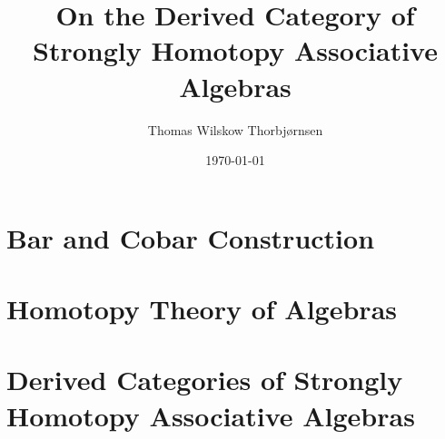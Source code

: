 \documentclass[american,titlepage]{ntnuthesis}
\title{On the Derived Category of Strongly Homotopy Associative Algebras}
\author{Thomas Wilskow Thorbjørnsen}
\date{\today}
\begin{document}
    


    \tableofcontents %

    \printglossary[type=\acronymtype] %
    \printglossary                    %


    \chapter{Bar and Cobar Construction}
        

    \chapter{Homotopy Theory of Algebras}
        

    \chapter{Derived Categories of Strongly Homotopy Associative Algebras}
        

    \chapter*{\bibname}
    \printbibliography[heading=none]


    \appendix
\end{document}
